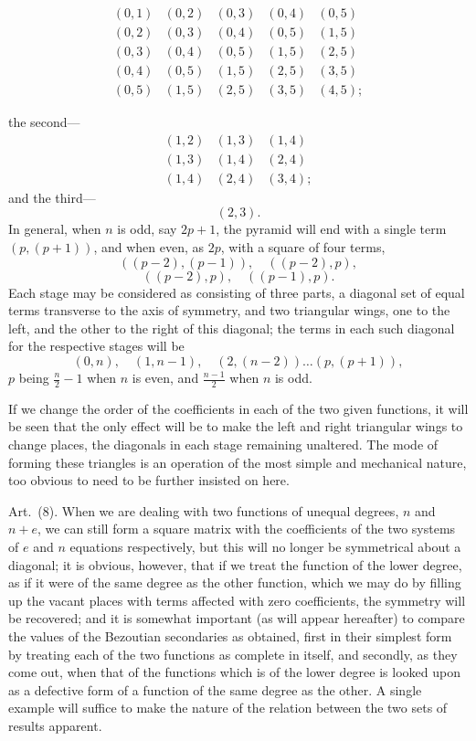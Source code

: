 \documentclass[11pt]{article}
\newcommand{\sourcepage}[1]{\marginpar{\scriptsize p.~#1}}
\newcommand{\art}[1]{\par\smallskip\noindent Art.~(#1).\quad}
\begin{document}
\[
\begin{array}{ccccc}
(0,1)&(0,2)&(0,3)&(0,4)&(0,5)\\
(0,2)&(0,3)&(0,4)&(0,5)&(1,5)\\
(0,3)&(0,4)&(0,5)&(1,5)&(2,5)\\
(0,4)&(0,5)&(1,5)&(2,5)&(3,5)\\
(0,5)&(1,5)&(2,5)&(3,5)&(4,5);
\end{array}
\]

\sourcepage{449}
the second---
\[
\begin{array}{ccc}
(1,2)&(1,3)&(1,4)\\
(1,3)&(1,4)&(2,4)\\
(1,4)&(2,4)&(3,4);
\end{array}
\]
and the third---
\[
(2,3).
\]
In general, when $n$ is odd, say $2p+1$, the pyramid will end with a single term $(p,(p+1))$, and when even, as $2p$, with a square of four terms,
\[
((p-2),(p-1)),\quad ((p-2),p),
\]
\[
((p-2),p),\quad ((p-1),p).
\]
Each stage may be considered as consisting of three parts, a diagonal set of equal terms transverse to the axis of symmetry, and two triangular wings, one to the left, and the other to the right of this diagonal; the terms in each such diagonal for the respective stages will be
\[
(0,n),\quad (1,n-1),\quad (2,(n-2))\ldots(p,(p+1)),
\]
$p$ being $\frac{n}{2}-1$ when $n$ is even, and $\frac{n-1}{2}$ when $n$ is odd.

If we change the order of the coefficients in each of the two given functions, it will be seen that the only effect will be to make the left and right triangular wings to change places, the diagonals in each stage remaining unaltered. The mode of forming these triangles is an operation of the most simple and mechanical nature, too obvious to need to be further insisted on here.

\art{8} When we are dealing with two functions of unequal degrees, $n$ and $n+e$, we can still form a square matrix with the coefficients of the two systems of $e$ and $n$ equations respectively, but this will no longer be symmetrical about a diagonal; it is obvious, however, that if we treat the function of the lower degree, as if it were of the same degree as the other function, which we may do by filling up the vacant places with terms affected with zero coefficients, the symmetry will be recovered; and it is somewhat important (as will appear hereafter) to compare the values of the Bezoutian secondaries as obtained, first in their simplest form by treating each of the two functions as complete in itself, and secondly, as they come out, when that of the functions which is of the lower degree is looked upon as a defective form of a function of the same degree as the other. A single example will suffice to make the nature of the relation between the two sets of results apparent.
\end{document}
